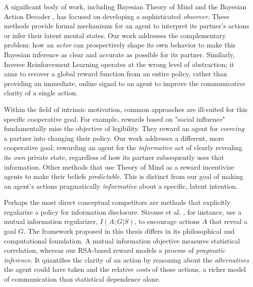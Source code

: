 \documentclass[12pt, a4paper]{report}
\begin{document}
A significant body of work, including Bayesian Theory of Mind \cite{Rabinowitz2018} and the Bayesian Action Decoder \cite{BayesAD}, has focused on developing a sophisticated \textit{observer}. These methods provide formal mechanisms for an agent to interpret its partner's actions or infer their latent mental states. Our work addresses the complementary problem: how an \textit{actor} can prospectively shape its own behavior to make this Bayesian inference as clear and accurate as possible for its partner. Similarly, Inverse Reinforcement Learning \cite{ARORA2021103500} operates at the wrong level of abstraction; it aims to recover a global reward function from an entire policy, rather than providing an immediate, online signal to an agent to improve the communicative clarity of a single action.

Within the field of intrinsic motivation, common approaches are ill-suited for this specific cooperative goal. For example, rewards based on "social influence" \cite{Jaques2019} fundamentally miss the objective of legibility. They reward an agent for \textit{coercing} a partner into changing their policy. Our work addresses a different, more cooperative goal: rewarding an agent for the \textit{informative} act of clearly revealing its \textit{own} private state, regardless of how its partner subsequently uses that information. Other methods that use Theory of Mind as a reward \cite{oguntola2023theory} incentivize agents to make their beliefs \textit{predictable}. This is distinct from our goal of making an agent's actions pragmatically \textit{informative} about a specific, latent intention.

Perhaps the most direct conceptual competitors are methods that explicitly regularize a policy for information disclosure. Strouse et al. \cite{NEURIPS2018_1ef03ed0}, for instance, use a mutual information regularizer, $I(A;G|S)$, to encourage actions $A$ that reveal a goal $G$. The framework proposed in this thesis differs in its philosophical and computational foundation. A mutual information objective measures statistical correlation, whereas our RSA-based reward models a process of \textit{pragmatic inference}. It quantifies the clarity of an action by reasoning about the \textit{alternatives} the agent could have taken and the relative \textit{costs} of those actions, a richer model of communication than statistical dependence alone.
\end{document}
